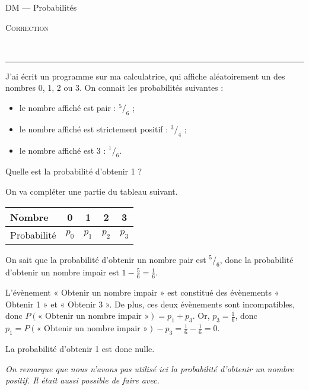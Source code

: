 \documentclass[11pt]{article}
\begin{document}
\begin{center}
  \textsc{DM}
  ---
  {
    \Large
    Probabilités
  }

    \textsc{Correction}

    ~
    \hrule
\end{center}

\begin{exercice}
  \begin{em}
    J'ai écrit un programme sur ma calculatrice, qui affiche aléatoirement un des nombres 0, 1, 2 ou 3. On connait les probabilités suivantes :
    \begin{itemize}
      \item le nombre affiché est pair : $^5/_6$ ;
      \item le nombre affiché est strictement positif : $^3/_4$ ;
      \item le nombre affiché est 3 : $^1/_6$.
    \end{itemize}
    Quelle est la probabilité d'obtenir 1 ?
  \end{em}

    On va compléter une partie du tableau suivant.

  \begin{center}\begin{tabular}{l|c|c|c|c}
    Nombre & 0 & 1 & 2 & 3 \\
    \hline
    Probabilité & $p_0$ & $p_1$ & $p_2$ & $p_3$
  \end{tabular}\end{center}

  On sait que la probabilité d'obtenir un nombre pair est $^5/_6$, donc la probabilité d'obtenir un nombre impair est $1-\frac{5}{6}=\frac{1}{6}$.

  L'évènement « Obtenir un nombre impair » est constitué des évènements « Obtenir 1 » et « Obtenir 3 ». De plus, ces deux évènements sont incompatibles, donc $P(\text{« Obtenir un nombre impair »}) = p_1 + p_3$. Or, $p_3=\frac{1}{6}$, donc $p_1=P(\text{« Obtenir un nombre impair »}) - p_3=\frac{1}{6}-\frac{1}{6}=0$.

La probabilité d'obtenir 1 est donc nulle.

\emph{On remarque que nous n'avons pas utilisé ici la probabilité d'obtenir un nombre positif. Il était aussi possible de faire avec.}


\end{exercice}
\end{document}
